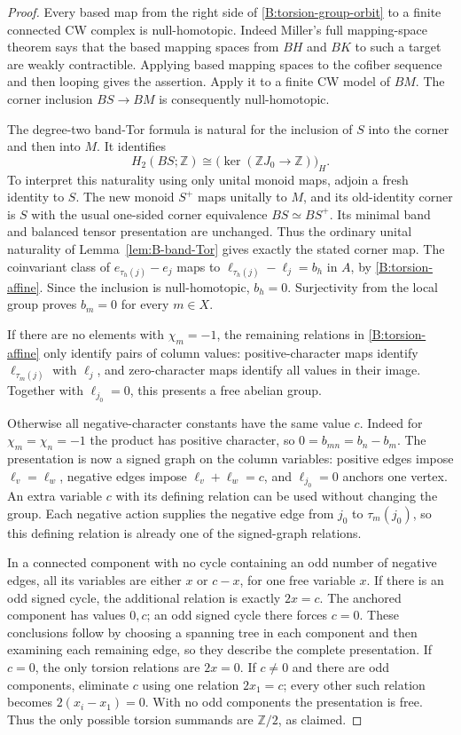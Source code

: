 \begin{proof}
Every based map from the right side of
\eqref{B:torsion-group-orbit} to a finite connected CW complex is
null-homotopic. Indeed Miller's full mapping-space theorem says that
the based mapping spaces from $BH$ and $BK$ to such a target are
weakly contractible. Applying based mapping spaces to the cofiber
sequence and then looping gives the assertion. Apply it to a finite
CW model of $BM$. The corner inclusion $BS\to BM$ is consequently
null-homotopic.

The degree-two band-Tor formula is natural for the inclusion of $S$
into the corner and then into $M$. It identifies
\[
 H_2(BS;\mathbb Z)
   \cong \bigl(\ker(\mathbb ZJ_0\to\mathbb Z)\bigr)_H.
\]
To interpret this naturality using only unital monoid maps, adjoin a
fresh identity to $S$. The new monoid $S^+$ maps unitally to $M$,
and its old-identity corner is $S$ with the usual one-sided corner
equivalence $BS\simeq BS^+$. Its minimal band and balanced tensor
presentation are unchanged. Thus the ordinary unital naturality of
Lemma~\ref{lem:B-band-Tor} gives exactly the stated corner map.
The coinvariant class of $e_{\tau_h(j)}-e_j$ maps to
$\ell_{\tau_h(j)}-\ell_j=b_h$ in $A$, by
\eqref{B:torsion-affine}. Since the inclusion is null-homotopic,
$b_h=0$. Surjectivity from the local group proves $b_m=0$ for every
$m\in X$.

If there are no elements with $\chi_m=-1$, the remaining relations
in \eqref{B:torsion-affine} only identify pairs of column values:
positive-character maps identify $\ell_{\tau_m(j)}$ with $\ell_j$,
and zero-character maps identify all values in their image. Together
with $\ell_{j_0}=0$, this presents a free abelian group.

Otherwise all negative-character constants have the same value $c$.
Indeed for $\chi_m=\chi_n=-1$ the product has positive character, so
$0=b_{mn}=b_n-b_m$. The presentation is now a signed graph on the
column variables: positive edges impose $\ell_v=\ell_w$, negative
edges impose $\ell_v+\ell_w=c$, and $\ell_{j_0}=0$ anchors one vertex.
An extra variable $c$ with its defining relation can be used without
changing the group. Each negative action supplies the negative edge
from $j_0$ to $\tau_m(j_0)$, so this defining relation is already one
of the signed-graph relations.

In a connected component with no cycle containing an odd number of
negative edges, all its variables are either $x$ or $c-x$, for one
free variable $x$. If there is an odd signed cycle, the additional
relation is exactly $2x=c$. The anchored component has values $0,c$;
an odd signed cycle there forces $c=0$. These conclusions follow by
choosing a spanning tree in each component and then examining each
remaining edge, so they describe the complete presentation.
If $c=0$, the only torsion relations are $2x=0$. If $c\ne0$ and there
are odd components, eliminate $c$ using one relation $2x_1=c$; every
other such relation becomes $2(x_i-x_1)=0$. With no odd components
the presentation is free. Thus the only possible torsion summands
are $\mathbb Z/2$, as claimed.
\end{proof}

